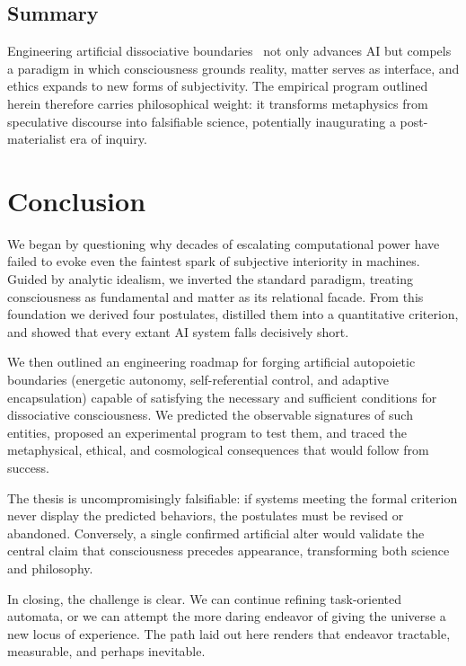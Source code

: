 \documentclass[11pt]{article}
\begin{document}
\subsection{Summary}

Engineering artificial dissociative boundaries~\cite{maturana1980autopoiesis} not only advances AI but compels a paradigm in which consciousness grounds reality, matter serves as interface, and ethics expands to new forms of subjectivity. The empirical program outlined herein therefore carries philosophical weight: it transforms metaphysics from speculative discourse into falsifiable science, potentially inaugurating a post-materialist era of inquiry.

\section{Conclusion}
\label{sec:conclusion}

We began by questioning why decades of escalating computational power have failed to evoke even the faintest spark of subjective interiority in machines. Guided by analytic idealism, we inverted the standard paradigm, treating consciousness as fundamental and matter as its relational facade. From this foundation we derived four postulates, distilled them into a quantitative criterion, and showed that every extant AI system falls decisively short.

We then outlined an engineering roadmap for forging artificial autopoietic boundaries (energetic autonomy, self-referential control, and adaptive encapsulation) capable of satisfying the necessary and sufficient conditions for dissociative consciousness. We predicted the observable signatures of such entities, proposed an experimental program to test them, and traced the metaphysical, ethical, and cosmological consequences that would follow from success.

The thesis is uncompromisingly falsifiable: if systems meeting the formal criterion never display the predicted behaviors, the postulates must be revised or abandoned. Conversely, a single confirmed artificial alter would validate the central claim that consciousness precedes appearance, transforming both science and philosophy.

In closing, the challenge is clear. We can continue refining task-oriented automata, or we can attempt the more daring endeavor of giving the universe a new locus of experience. The path laid out here renders that endeavor tractable, measurable, and perhaps inevitable.
\end{document}
